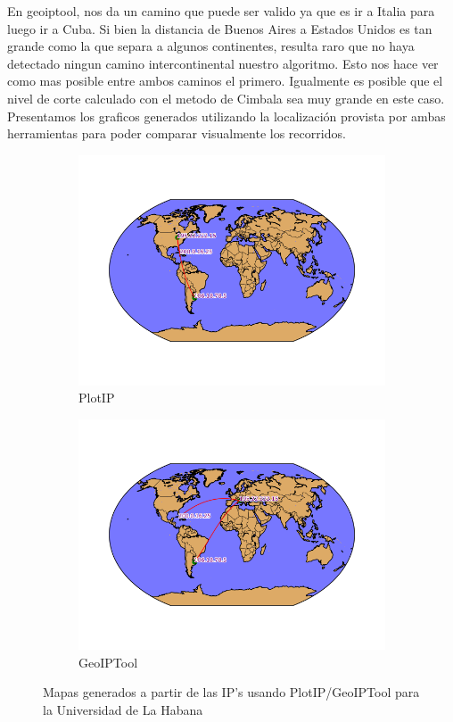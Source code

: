 En geoiptool, nos da un camino que puede ser valido ya que es ir a Italia para luego ir a Cuba. Si bien la distancia de Buenos Aires a Estados Unidos es tan grande como la que separa a algunos continentes, resulta raro que no haya detectado ningun camino intercontinental nuestro algoritmo. Esto nos hace ver como mas posible entre ambos caminos el primero. Igualmente es posible que el nivel de corte calculado con el metodo de Cimbala sea muy grande en este caso.\\

Presentamos los graficos generados utilizando la localizaci\'on provista por ambas herramientas para poder comparar visualmente los recorridos.

\begin{figure}[ht]
	\begin{subfigure}[b]{0.5\textwidth}
		\centering
		\includegraphics[width=\linewidth]{imagenes/mapa_habana_plotip.png}
		\caption{PlotIP}
	\end{subfigure} 
	\begin{subfigure}[b]{0.5\textwidth}
		\centering
		\includegraphics[width=\linewidth]{imagenes/mapa_habana_geoip.png}
		\caption{GeoIPTool}
	\end{subfigure} 
	\caption{Mapas generados a partir de las IP's usando PlotIP/GeoIPTool para la Universidad de La Habana}
\end{figure}

